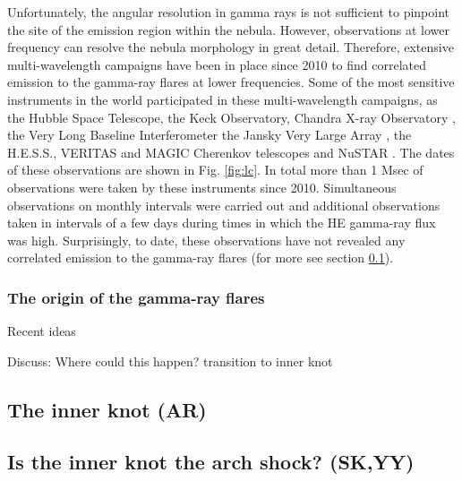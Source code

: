Unfortunately, the angular resolution in gamma rays is not sufficient to pinpoint the site of the emission region within the nebula. However, observations at lower frequency can resolve the nebula morphology in great detail. Therefore, extensive multi-wavelength campaigns have been in place since 2010 to find correlated emission to the gamma-ray flares at lower frequencies. Some of the most sensitive instruments in the world participated in these multi-wavelength campaigns, as the Hubble Space Telescope, the Keck Observatory, Chandra X-ray Observatory \citep{Weisskopf2013,rudy2015}, the Very Long Baseline Interferometer \citep{Lobanov2011}  the Jansky Very Large Array \citep{Bietenholz2014}, the H.E.S.S., VERITAS and MAGIC Cherenkov telescopes \citep{Abramowski2014,Aliu2014,Aleksic2015} and NuSTAR \citep{Madsen2015}. The dates of these observations are shown in Fig. \ref{fig:lc}. In total more than 1 Msec of observations were taken by these  instruments since 2010. Simultaneous observations on monthly intervals were carried out and additional observations taken in intervals of a few days during times in which the HE gamma-ray flux was high. Surprisingly, to date, these observations have not revealed any correlated emission to the gamma-ray flares (for more see section \ref{sec:knot}). 

\subsubsection{The origin of the gamma-ray flares}

Recent ideas  \cite{2016arXiv160403179Y}\cite{2015arXiv151205426Z}\cite{2016arXiv160304850N}\cite{2016arXiv160305731L}

Discuss: Where could this happen? transition to inner knot

\subsection{The inner knot   (AR)}
\label{sec:knot}
\subsection{Is the inner knot the arch shock?                                      (SK,YY)}
